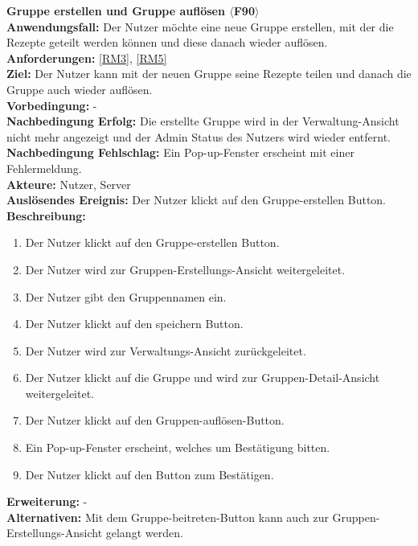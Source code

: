 \documentclass[parskip=full]{scrartcl}
\begin{document}
\textbf{Gruppe erstellen und Gruppe auflösen $\langle$F90$\rangle$}\\
\textbf{Anwendungsfall:} Der Nutzer möchte eine neue Gruppe erstellen, mit der die Rezepte geteilt werden können und diese danach wieder auflösen.\\
\textbf{Anforderungen:} \ref{RM3}, \ref{RM5} \\
\textbf{Ziel:} Der Nutzer kann mit der neuen Gruppe seine Rezepte teilen und danach die Gruppe auch wieder auflösen.\\
\textbf{Vorbedingung:} -\\
\textbf{Nachbedingung Erfolg:} Die erstellte Gruppe wird in der Verwaltung-Ansicht nicht mehr angezeigt und der Admin Status des Nutzers wird wieder entfernt.\\
\textbf{Nachbedingung Fehlschlag:} Ein Pop-up-Fenster erscheint mit einer Fehlermeldung.\\
\textbf{Akteure:} Nutzer, Server\\
\textbf{Auslösendes Ereignis:} Der Nutzer klickt auf den Gruppe-erstellen Button.\\
\textbf{Beschreibung:}
\begin{enumerate}	
    \item Der Nutzer klickt auf den Gruppe-erstellen Button.
    \item Der Nutzer wird zur Gruppen-Erstellungs-Ansicht weitergeleitet.
    \item Der Nutzer gibt den Gruppennamen ein.
    \item Der Nutzer klickt auf den speichern Button.
    \item Der Nutzer wird zur Verwaltungs-Ansicht zurückgeleitet.
    \item Der Nutzer klickt auf die Gruppe und wird zur Gruppen-Detail-Ansicht weitergeleitet.
    \item Der Nutzer klickt auf den Gruppen-auflösen-Button.
    \item Ein Pop-up-Fenster erscheint, welches um Bestätigung bitten.
    \item Der Nutzer klickt auf den Button zum Bestätigen.
\end{enumerate}
\textbf{Erweiterung:} -\\
\textbf{Alternativen:} Mit dem Gruppe-beitreten-Button kann auch zur Gruppen-Erstellungs-Ansicht gelangt werden.\\
\newpage
\end{document}
